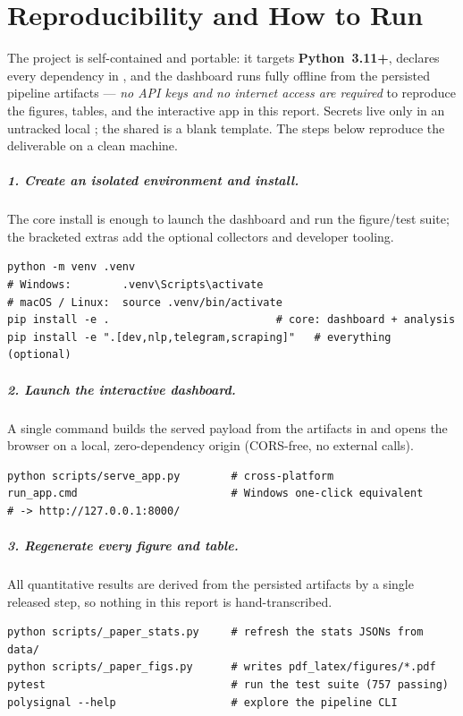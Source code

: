 \appendix

\chapter{Reproducibility and How to Run}
\label{ch:reproduce}
The project is self-contained and portable: it targets \textbf{Python~3.11+}, declares
every dependency in , and the dashboard runs fully offline from the
persisted pipeline artifacts --- \emph{no API keys and no internet access are required}
to reproduce the figures, tables, and the interactive app in this report. Secrets live
only in an untracked local ; the shared  is a blank
template. The steps below reproduce the deliverable on a clean machine.

\paragraph{1. Create an isolated environment and install.}
The core install is enough to launch the dashboard and run the figure/test suite; the
bracketed extras add the optional collectors and developer tooling.
{\small\begin{verbatim}
python -m venv .venv
# Windows:        .venv\Scripts\activate
# macOS / Linux:  source .venv/bin/activate
pip install -e .                          # core: dashboard + analysis
pip install -e ".[dev,nlp,telegram,scraping]"   # everything (optional)
\end{verbatim}}

\paragraph{2. Launch the interactive dashboard.}
A single command builds the served payload from the artifacts in  and opens
the browser on a local, zero-dependency origin (CORS-free, no external calls).
{\small\begin{verbatim}
python scripts/serve_app.py        # cross-platform
run_app.cmd                        # Windows one-click equivalent
# -> http://127.0.0.1:8000/
\end{verbatim}}

\paragraph{3. Regenerate every figure and table.}
All quantitative results are derived from the persisted artifacts by a single released
step, so nothing in this report is hand-transcribed.
{\small\begin{verbatim}
python scripts/_paper_stats.py     # refresh the stats JSONs from data/
python scripts/_paper_figs.py      # writes pdf_latex/figures/*.pdf
pytest                             # run the test suite (757 passing)
polysignal --help                  # explore the pipeline CLI
\end{verbatim}}

